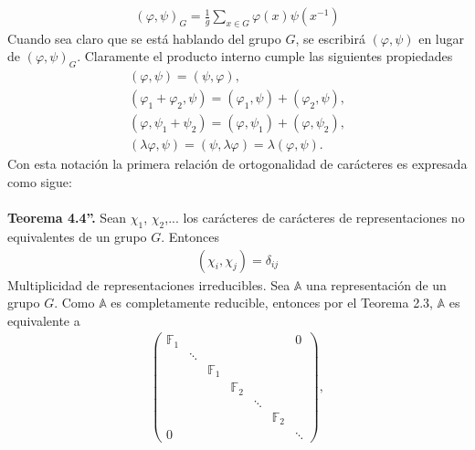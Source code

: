 \documentclass[12pt]{book}
\theoremstyle{definition}
\newcounter{in}
\begin{document}
\begin{equation*}
\begin{aligned}
(\varphi,\psi)_{G} = \frac{1}{g} \sum_{x \in G} \varphi(x) \psi(x^{-1})
\end{aligned}
\end{equation*}
Cuando sea claro que se está hablando del grupo $G$, se escribirá $(\varphi,\psi)$ en lugar de $(\varphi,\psi)_{G}$. Claramente el producto interno cumple las siguientes propiedades
\begin{equation*}
\begin{aligned}
(\varphi,\psi)=(\psi,\varphi),\\
(\varphi_{1}+\varphi_{2},\psi)=(\varphi_{1},\psi)+(\varphi_{2},\psi),\\
(\varphi,\psi_{1}+\psi_{2})=(\varphi,\psi_{1})+(\varphi,\psi_{2}),\\
(\lambda \varphi,\psi)=(\psi,\lambda \varphi)=\lambda (\varphi,\psi).
\end{aligned}
\end{equation*}
Con esta notación la primera relación de ortogonalidad de carácteres es expresada como sigue:\\~\\
\textbf{Teorema 4.4''. } Sean $\chi_{1}$, $\chi_{2}$,... los carácteres de carácteres de representaciones no equivalentes de un grupo $G$. Entonces
\begin{equation*}
\begin{aligned}
(\chi_{i},\chi_{j})=\delta_{ij}
\end{aligned}
\end{equation*} 
Multiplicidad de representaciones irreducibles. Sea $\mathbb{A}$ una representación de un grupo $G$. Como $\mathbb{A}$ es completamente reducible, entonces por el Teorema 2.3, $\mathbb{A}$ es equivalente a 
\begin{equation*}
\begin{aligned}
\begin{pmatrix}
\mathbb{F}_{1} & & & & & & 0\\ 
 & \ddots & & & & & \\
 & & \mathbb{F}_{1} & & & & \\
 & & & \mathbb{F}_{2} & & & \\
 & & & & \ddots & & \\
 & & & & & \mathbb{F}_{2} & \\
0 & & & & & & \ddots
\end{pmatrix},
\end{aligned}
\end{equation*}
\end{document}
